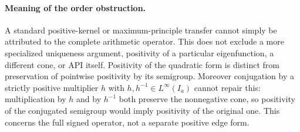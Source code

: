 \paragraph{Meaning of the order obstruction.}
A standard positive-kernel or maximum-principle transfer cannot simply
be attributed to the complete arithmetic operator. This does not
exclude a more specialized uniqueness argument, positivity of a
particular eigenfunction, a different cone, or API itself.
Positivity of the quadratic form is distinct from preservation of
pointwise positivity by its semigroup. Moreover conjugation by a
strictly positive multiplier $h$ with $h,h^{-1}\in L^\infty(I_a)$
cannot repair this: multiplication by $h$ and by $h^{-1}$ both
preserve the nonnegative cone, so positivity of the conjugated
semigroup would imply positivity of the original one. This concerns
the full signed operator, not a separate positive edge form.

